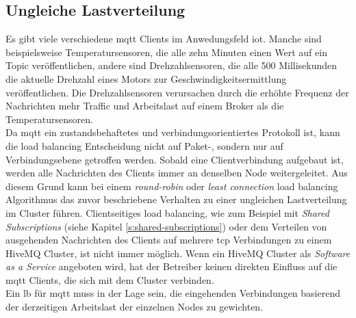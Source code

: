 \subsection{Ungleiche Lastverteilung} \label{sp:load}
Es gibt viele verschiedene \ac{mqtt} Clients im Anwedungsfeld \ac{iot}. Manche sind beispielsweise Temperatursensoren, die alle zehn Minuten einen Wert auf ein Topic veröffentlichen, andere sind Drehzahlsensoren, die alle 500 Millisekunden die aktuelle Drehzahl eines Motors zur Geschwindigkeitsermittlung veröffentlichen.
Die Drehzahlsensoren verursachen durch die erhöhte Frequenz der Nachrichten mehr Traffic und Arbeitslast auf einem Broker als die Temperatursensoren.
\\
Da \ac{mqtt} ein zustandsbehaftetes und verbindungsorientiertes Protokoll ist, kann die load balancing Entscheidung nicht auf Paket-, sondern nur auf Verbindungsebene getroffen werden. Sobald eine Clientverbindung aufgebaut ist, werden alle Nachrichten des Clients immer an denselben Node weitergeleitet.
Aus diesem Grund kann bei einem \textit{round-robin} oder \textit{least connection} load balancing Algorithmus das zuvor beschriebene Verhalten zu einer ungleichen Lastverteilung im Cluster führen.
Clientseitiges load balancing, wie zum Beispiel mit \textit{Shared Subscriptions} (siehe Kapitel \ref{s:shared-subscriptions}) oder dem Verteilen von ausgehenden Nachrichten des Clients auf mehrere \ac{tcp} Verbindungen zu einem HiveMQ Cluster, ist nicht immer möglich. Wenn ein HiveMQ Cluster als \textit{Software as a Service} angeboten wird, hat der Betreiber keinen direkten Einfluss auf die \ac{mqtt} Clients, die sich mit dem Cluster verbinden.
\\
Ein \ac{lb} für \ac{mqtt} muss in der Lage sein, die eingehenden Verbindungen basierend der derzeitigen Arbeitslast der einzelnen Nodes zu gewichten.

\newpage
